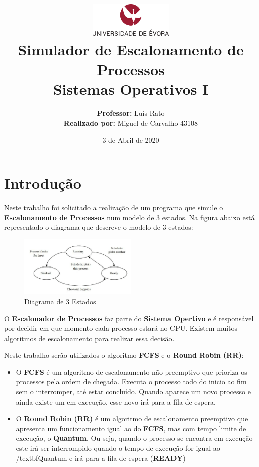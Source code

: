 \documentclass[11pt]{article}   %
\title
{
    \includegraphics[width=0.3\textwidth]{images/logo_universidade.png}
    \\[0.1cm]
    \textbf{Simulador de Escalonamento de Processos} \\
    Sistemas Operativos I
}
\author
{
    \textbf{Professor:} Luís Rato \\
    \textbf{Realizado por:} Miguel de Carvalho 43108 
}
\date{3 de Abril de 2020}
\begin{document}
\maketitle

\section{Introdução} 

\hspace{0,5cm}Neste trabalho foi solicitado a realização de um programa que simule o \textbf{Escalonamento de Processos} num modelo de 3 estados. Na figura abaixo está representado o diagrama que descreve o modelo de 3 estados:\par
\begin{figure}[h!]
    \begin{center}
        \includegraphics[width=0.5\textwidth]{images/states.png}
        \caption{Diagrama de 3 Estados}
    \end{center}
\end{figure}
O \textbf{Escalonador de Processos} faz parte do \textbf{Sistema Opertivo} e é responsável por decidir em que momento cada processo estará no CPU. 
Existem muitos algoritmos de escalonamento para realizar essa decisão. \par
Neste trabalho serão utilizados o algoritmo \textbf{FCFS} e o \textbf{Round Robin (RR)}:
\begin{itemize}
    \item O \textbf{FCFS} é um algoritmo de escalonamento não preemptivo que prioriza os processos pela ordem de chegada. Executa o processo todo do inicio ao fim sem o interromper, até estar concluído. Quando aparece um novo processo e ainda existe um em execução, esse novo irá para a fila de espera.
    \item O \textbf{Round Robin (RR)} é um algoritmo de escalonamento preemptivo que apresenta um funcionamento igual ao do \textbf{FCFS}, mas com tempo limite de execução, o \textbf{Quantum}. Ou seja, quando o processo se encontra em execução este irá ser interrompido quando o tempo de execução for igual ao /textbf{Quantum} e irá para a fila de espera (\textbf{READY}) 
\end{itemize}
\end{document}
